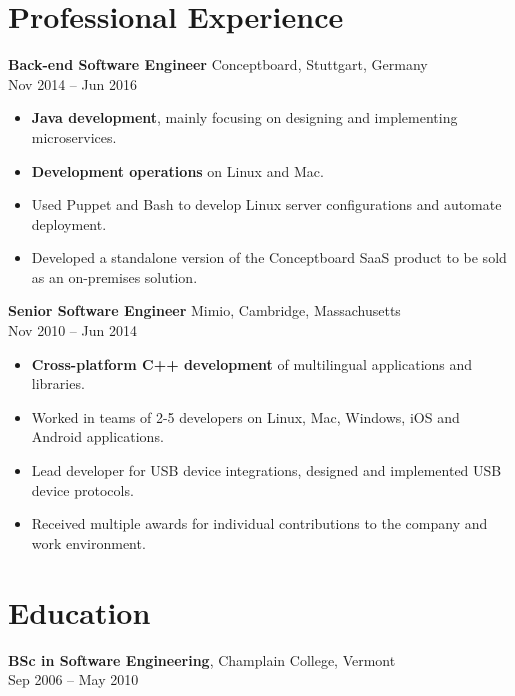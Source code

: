 \documentclass{article}
\begin{document}
\section*{Professional Experience}
{\large {\bf Back-end Software Engineer} Conceptboard, Stuttgart, Germany}\\
Nov 2014 -- Jun 2016
\begin{itemize}
  \item {\bf Java development}, mainly focusing on designing and implementing microservices.
  \item {\bf Development operations} on Linux and Mac.
  \item Used Puppet and Bash to develop Linux server configurations and automate deployment.
  \item Developed a standalone version of the Conceptboard SaaS product to be sold as an on-premises solution.\\
\end{itemize}
{\large {\bf Senior Software Engineer} Mimio, Cambridge, Massachusetts}\\
Nov 2010 -- Jun 2014
\begin{itemize}
  \item {\bf Cross-platform C++ development} of multilingual applications and libraries.
  \item Worked in teams of 2-5 developers on Linux, Mac, Windows, iOS and Android applications.
  \item Lead developer for USB device integrations, designed and implemented USB device protocols.
  \item Received multiple awards for individual contributions to the company and work environment.
\end{itemize}

\section*{Education}
{\large {\bf BSc in Software Engineering}, Champlain College, Vermont}\\
Sep 2006 -- May 2010
\end{document}
